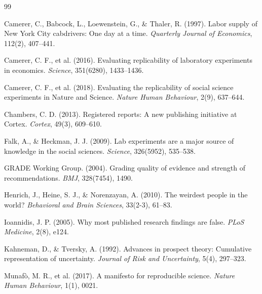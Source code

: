 \documentclass[11pt,a4paper]{article}
\begin{document}



\begin{thebibliography}{99}

Camerer, C., Babcock, L., Loewenstein, G., \& Thaler, R. (1997).
Labor supply of New York City cabdrivers: One day at a time.
\textit{Quarterly Journal of Economics}, 112(2), 407--441.

Camerer, C. F., et al. (2016).
Evaluating replicability of laboratory experiments in economics.
\textit{Science}, 351(6280), 1433--1436.

Camerer, C. F., et al. (2018).
Evaluating the replicability of social science experiments in Nature and Science.
\textit{Nature Human Behaviour}, 2(9), 637--644.

Chambers, C. D. (2013).
Registered reports: A new publishing initiative at Cortex.
\textit{Cortex}, 49(3), 609--610.

Falk, A., \& Heckman, J. J. (2009).
Lab experiments are a major source of knowledge in the social sciences.
\textit{Science}, 326(5952), 535--538.

GRADE Working Group. (2004).
Grading quality of evidence and strength of recommendations.
\textit{BMJ}, 328(7454), 1490.

Henrich, J., Heine, S. J., \& Norenzayan, A. (2010).
The weirdest people in the world?
\textit{Behavioral and Brain Sciences}, 33(2-3), 61--83.

Ioannidis, J. P. (2005).
Why most published research findings are false.
\textit{PLoS Medicine}, 2(8), e124.

Kahneman, D., \& Tversky, A. (1992).
Advances in prospect theory: Cumulative representation of uncertainty.
\textit{Journal of Risk and Uncertainty}, 5(4), 297--323.

Munaf\`{o}, M. R., et al. (2017).
A manifesto for reproducible science.
\textit{Nature Human Behaviour}, 1(1), 0021.


\end{thebibliography}
\end{document}
